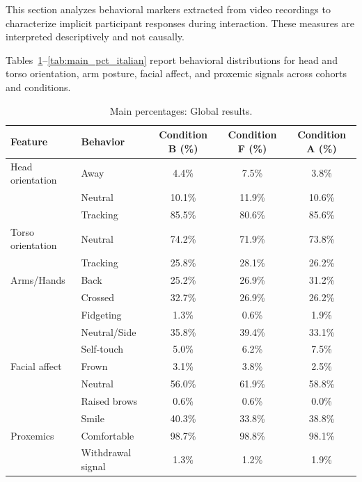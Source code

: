 This section analyzes behavioral markers extracted from video recordings to characterize implicit participant responses during interaction. These measures are interpreted descriptively and not causally.

Tables~\ref{tab:main_pct_global}--\ref{tab:main_pct_italian} report behavioral distributions for head and torso orientation, arm posture, facial affect, and proxemic signals across cohorts and conditions.

\begin{table}[!ht]
\centering
\begin{tabular}{llccc}
\toprule
Feature & Behavior & Condition B (\%) & Condition F (\%) & Condition A (\%) \\
\midrule
Head orientation & Away & 4.4\% & 7.5\% & 3.8\% \\
~ & Neutral & 10.1\% & 11.9\% & 10.6\% \\
~ & Tracking & 85.5\% & 80.6\% & 85.6\% \\
\midrule
Torso orientation & Neutral & 74.2\% & 71.9\% & 73.8\% \\
~ & Tracking & 25.8\% & 28.1\% & 26.2\% \\
\midrule
Arms/Hands & Back & 25.2\% & 26.9\% & 31.2\% \\
~ & Crossed & 32.7\% & 26.9\% & 26.2\% \\
~ & Fidgeting & 1.3\% & 0.6\% & 1.9\% \\
~ & Neutral/Side & 35.8\% & 39.4\% & 33.1\% \\
~ & Self-touch & 5.0\% & 6.2\% & 7.5\% \\
\midrule
Facial affect & Frown & 3.1\% & 3.8\% & 2.5\% \\
~ & Neutral & 56.0\% & 61.9\% & 58.8\% \\
~ & Raised brows & 0.6\% & 0.6\% & 0.0\% \\
~ & Smile & 40.3\% & 33.8\% & 38.8\% \\
\midrule
Proxemics & Comfortable & 98.7\% & 98.8\% & 98.1\% \\
~ & Withdrawal signal & 1.3\% & 1.2\% & 1.9\% \\
\bottomrule
\end{tabular}
\caption{Main percentages: Global results.}
\label{tab:main_pct_global}
\end{table}

